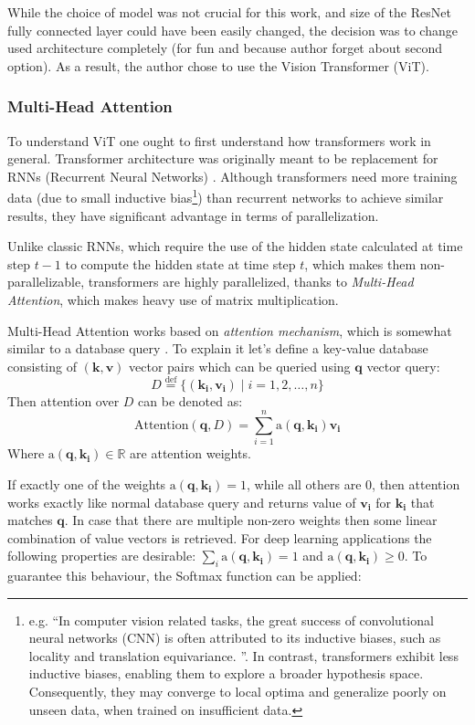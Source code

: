 While the choice of model was not crucial for this work, and size of the ResNet fully connected layer could have been easily changed, the decision was to change used architecture completely (for fun and because author forget about second option). 
As a result, the author chose to use the Vision Transformer (ViT).

\subsubsection{Multi-Head Attention}
To understand ViT one ought to first understand how transformers work in general.
Transformer architecture was originally meant to be replacement for RNNs (Recurrent Neural Networks) \cite{Vaswani2017}.
Although transformers need more training data (due to small inductive bias\footnote{e.g. ``In computer vision related tasks, the great success of convolutional neural networks (CNN) is often attributed to its inductive biases, such as locality and translation equivariance. \cite{Mormille2023}''. 
In contrast, transformers exhibit less inductive biases, enabling them to explore a broader hypothesis space. 
Consequently, they may converge to local optima and generalize poorly on unseen data, when trained on insufficient data.}) 
than recurrent networks to achieve similar results, they have significant advantage in terms of parallelization.

Unlike classic RNNs, which require the use of the hidden state calculated at time step $t-1$ to compute the hidden state at time step $t$, which makes them non-parallelizable, transformers are highly parallelized, thanks to \emph{Multi-Head Attention}, which makes heavy use of matrix multiplication.

Multi-Head Attention works based on \emph{attention mechanism}, which is somewhat similar to a database query \cite{d2lAttentionMechanism}.
To explain it let's define a key-value database consisting of $(\mathbf{k}, \textbf{v})$ vector pairs which can be queried using $\mathbf{q}$ vector query: \[ D\overset{\text{def}}{=}\{(\mathbf{k_i}, \mathbf{v_i}) \mid i = 1, 2, \ldots, n\}\]
Then attention over $D$ can be denoted as:
\[ \text{Attention}(\mathbf{q}, D) = \sum_{i=1}^{n}\text{a}(\mathbf{q}, \mathbf{k_i})\mathbf{v_i} \]
Where $\text{a}(\mathbf{q}, \mathbf{k_i}) \in \mathbb{R}$ are attention weights.

If exactly one of the weights $\text{a}(\mathbf{q},\mathbf{k_i}) = 1$, while all others are $0$, then attention works exactly like normal database query and returns value of $\mathbf{v_i}$ for $\mathbf{k_i}$ that matches $\mathbf{q}$.
In case that there are multiple non-zero weights then some linear combination of value vectors is retrieved. 
For deep learning applications the following properties are desirable: $\sum_i \text{a}(\mathbf{q}, \mathbf{k_i}) = 1$ and $\text{a}(\mathbf{q}, \mathbf{k_i}) \ge 0$. To guarantee this behaviour, the Softmax function can be applied:

